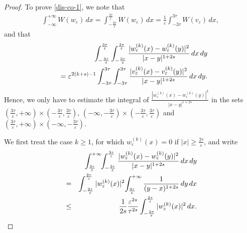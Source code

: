 \documentclass{article}
\newcommand{\e}{\varepsilon}
\begin{document}
\begin{proof}
To prove \eqref{dis-co-1}, we note that 
\begin{eqnarray*}
\int_{-\infty}^{+\infty} W(w_\e)\, dx=\int_{-\frac{3\tau}{\e}}^{\frac{3\tau}{\e}} W(w_\e)\, dx=\frac{1}{\e}\int_{-3\tau}^{3\tau} W(v_\e)\, dx, 
\end{eqnarray*}
and that 
\begin{eqnarray*}
&&\hskip-2cm\int_{-\frac{3\tau}{\e}}^{\frac{3\tau}{\e}} \int_{-\frac{3\tau}{\e}}^{\frac{3\tau}{\e}} \frac{|w_\e^{(k)}(x)-w_\e^{(k)}(y)|^2}{|x-y|^{1+2s}}\, dx\, dy\\
&&=\e^{2(k+s)-1}\int_{-3\tau}^{3\tau} \int_{-3\tau}^{3\tau} \frac{|v_\e^{(k)}(x)-v_\e^{(k)}(y)|^2}{|x-y|^{1+2s}}\, dx\, dy.  
\end{eqnarray*}
Hence, we only have to estimate the integral of $\frac{|w_\e^{(k)}(x)-w_\e^{(k)}(y)|^2}{|x-y|^{1+2s}}$ in the sets $(\frac{3\tau}{\e},+\infty)\times (-\frac{3\tau}{\e},\frac{3\tau}{\e})$, $(-\infty, -\frac{3\tau}{\e})\times (-\frac{3\tau}{\e},\frac{3\tau}{\e})$ and $(\frac{3\tau}{\e},+\infty)\times (-\infty, -\frac{3\tau}{\e})$. 

\smallskip
We first treat the case $k\geq 1$, for which $w_\e^{(k)}(x)=0$ if $|x|\ge \frac{2\tau}{\e}$, and write 
\begin{eqnarray}\label{sti-ca-1}\nonumber
&&\hskip-2cm\int_{\frac{3\tau}{\e}}^{+\infty}\!\!\int_{-\frac{3\tau}{\e}}^{\frac{3\tau}{\e}} \frac{|w_\e^{(k)}(x)-w_\e^{(k)}(y)|^2}{|x-y|^{1+2s}}\, dx\, dy\\&=&\nonumber\int_{-\frac{2\tau}{\e}}^{\frac{2\tau}{\e}} |w_\e^{(k)}(x)|^2 \!\int_{\frac{3\tau}{\e}}^{+\infty}\frac{1}{(y-x)^{1+2s}}\, dy\, dx\\
&\leq&\frac{1}{2s} \frac{\e^{2s}}{\tau^{2s}}\int_{-\frac{2\tau}{\e}}^{\frac{2\tau}{\e}} |w_\e^{(k)}(x)|^2 %
\, dx.
\end{eqnarray}


\end{proof}
\end{document}

